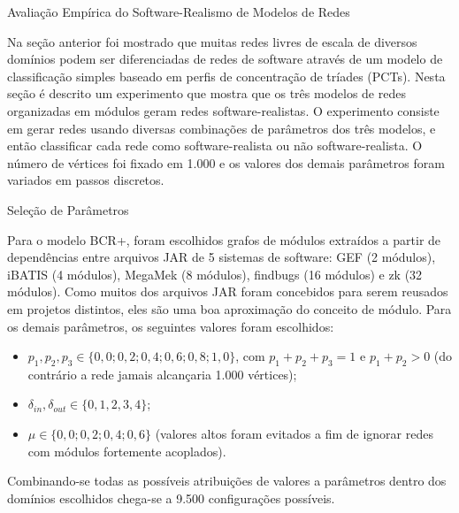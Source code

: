 \begin{section}{Avaliação Empírica do Software-Realismo de Modelos de Redes}

Na seção anterior foi mostrado que muitas redes livres de escala de diversos domínios podem ser diferenciadas de redes de software através de um modelo de classificação simples baseado em perfis de concentração de tríades (PCTs). Nesta seção é descrito um experimento que mostra que os três modelos de redes organizadas em módulos geram redes software-realistas. O experimento consiste em gerar redes usando diversas combinações de parâmetros dos três modelos, e então classificar cada rede como software-realista ou não software-realista. O número de vértices foi fixado em 1.000 e os valores dos demais parâmetros foram variados em passos discretos. 


\begin{subsection}{Seleção de Parâmetros} \label{sec:parametros}

Para o modelo BCR+, foram escolhidos grafos de módulos extraídos a partir de dependências entre arquivos JAR de 5 sistemas de software: GEF (2 módulos), iBATIS (4 módulos), MegaMek (8 módulos), findbugs (16 módulos) e zk (32 módulos). Como muitos dos arquivos JAR foram concebidos para serem reusados em projetos distintos, eles são uma boa aproximação do conceito de módulo. Para os demais parâmetros, os seguintes valores foram escolhidos:

\begin{itemize}
	\item $p_1, p_2, p_3 \in \{0,0; 0,2; 0,4; 0,6; 0,8; 1,0\}$, com $p_1 + p_2 + p_3 = 1$ e $p_1 + p_2 > 0$ (do contrário a rede jamais alcançaria 1.000 vértices);
	\item $\delta_{in}, \delta_{out} \in \{0, 1, 2, 3, 4\}$;
	\item $\mu \in \{0,0; 0,2; 0,4; 0,6\}$ (valores altos foram evitados a fim de ignorar redes com módulos fortemente acoplados).
\end{itemize}

Combinando-se todas as possíveis atribuições de valores a parâmetros dentro dos domínios escolhidos chega-se a 9.500 configurações possíveis.


\end{subsection}
\end{section}
